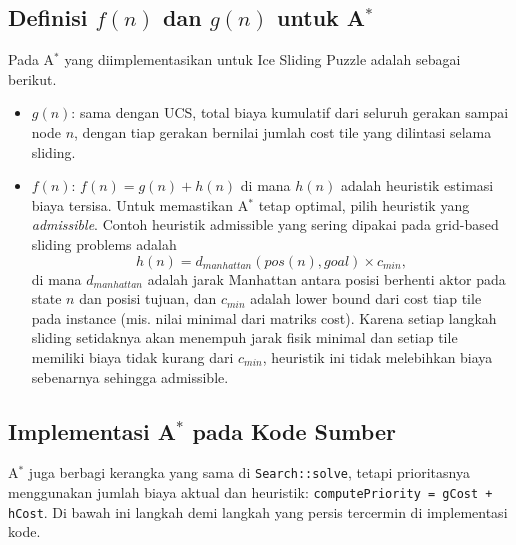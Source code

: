 \subsection{Definisi $f(n)$ dan $g(n)$ untuk A$^\ast$}
Pada A$^\ast$ yang diimplementasikan untuk Ice Sliding Puzzle adalah sebagai berikut.
\begin{itemize}
    \item $g(n)$: sama dengan UCS, total biaya kumulatif dari seluruh gerakan sampai node $n$, dengan tiap gerakan bernilai jumlah cost tile yang dilintasi selama sliding.
    \item $f(n)$: $f(n)=g(n)+h(n)$ di mana $h(n)$ adalah heuristik estimasi biaya tersisa. Untuk memastikan A$^\ast$ tetap optimal, pilih heuristik yang \emph{admissible}. Contoh heuristik admissible yang sering dipakai pada grid-based sliding problems adalah
          $$h(n) = d_{manhattan}(pos(n), goal) \times c_{min},$$
          di mana $d_{manhattan}$ adalah jarak Manhattan antara posisi berhenti aktor pada state $n$ dan posisi tujuan, dan $c_{min}$ adalah lower bound dari cost tiap tile pada instance (mis. nilai minimal dari matriks cost). Karena setiap langkah sliding setidaknya akan menempuh jarak fisik minimal dan setiap tile memiliki biaya tidak kurang dari $c_{min}$, heuristik ini tidak melebihkan biaya sebenarnya sehingga admissible.
\end{itemize}

\subsection{Implementasi A$^\ast$ pada Kode Sumber}
A$^\ast$ juga berbagi kerangka yang sama di \texttt{Search::solve}, tetapi prioritasnya menggunakan jumlah biaya aktual dan heuristik: \texttt{computePriority = gCost + hCost}. Di bawah ini langkah demi langkah yang persis tercermin di implementasi kode.

